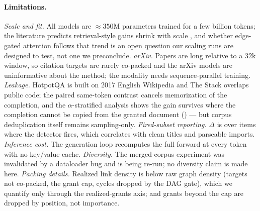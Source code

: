 \paragraph{Limitations.}
\emph{Scale and fit.} All models are $\approx350$M parameters trained for a few billion
tokens; the literature predicts retrieval-style gains shrink with scale
\citep{khandelwal2020knnlm,borgeaud2022retro,taylor2022galactica}, and whether
edge-gated attention follows that trend is an open question our scaling runs are
designed to test, not one we preconclude. \emph{arXiv.} Papers are long relative to a
$32$k window, so citation targets are rarely co-packed and the arXiv models are
uninformative about the method; the modality needs sequence-parallel training.
\emph{Leakage.} HotpotQA is built on 2017 English Wikipedia and The Stack overlaps
public code; the paired same-token contrast cancels memorization of the completion,
and the $\alpha$-stratified analysis shows the gain survives where the completion
cannot be copied from the granted document () --- but
corpus deduplication itself remains sampling-only. \emph{Fired-subset reporting.} $\Delta$ is over items where the
detector fires, which correlates with clean titles and parseable imports.
\emph{Inference cost.} The generation loop recomputes the full forward at every token
with no key/value cache. \emph{Diversity.} The merged-corpus experiment was invalidated
by a dataloader bug and is being re-run; no diversity claim is made here.
\emph{Packing details.} Realized link density is below raw graph density (targets not
co-packed, the grant cap, cycles dropped by the DAG gate), which we quantify only
through the realized-grants axis; and grants beyond the cap are dropped by position,
not importance.
